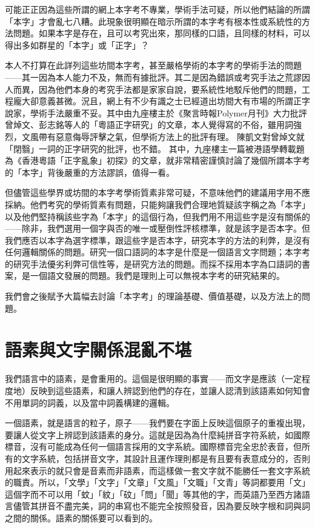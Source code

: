 \documentclass[a5paper, 10pt, openany]{book} %
\begin{document}
可能正正因為這些所謂的網上本字考不專業，學術手法可疑，所以他們結論的所謂「本字」才會亂七八糟。此現象很明顯在暗示所謂的本字考有根本性或系統性的方法問題。如果本字是存在，且可以考究出來，那同樣的口語，且同樣的材料，可以得出多如群星的「本字」或「正字」？

本人不打算在此詳列這些坊間本字考，甚至嚴格學術的本字考的學術手法的問題——其一因為本人能力不及，無而有據批評。其二是因為錯誤或考究手法之荒謬因人而異，因為他們本身的考究手法都是家家自說，要系統性地駁斥他們的問題，工程龐大卻意義甚微。況且，網上有不少有識之士已經道出坊間大有市場的所謂正字說家，學術手法嚴重不妥。其中由九座樓主於《聚言時報Polymer月刊》大力批評曾焯文、彭志銘等人的「粵語正字研究」的文章，本人覺得寫的不俗，雖用詞強烈，文風帶有惡意侮辱評擊之氣，但學術方法上的批評有理。 陳凱文對曾焯文就「閉翳」一詞的正字研究的批評，也不錯。  其中，九座樓主一篇被港語學轉載題為《香港粵語「正字亂象」初探》的文章，就非常精密謹慎討論了幾個所謂本字考的「本字」背後嚴重的方法謬誤，值得一看。 

但儘管這些學界或坊間的本字考學術質素非常可疑，不意味他們的建議用字用不應採納。他們考究的學術質素有問題，只能夠讓我們合理地質疑該字稱之為「本字」以及他們堅持稱該些字為「本字」的這個行為，但我們用不用這些字是沒有關係的——除非，我們選用一個字與否的唯一或壓倒性評核標準，就是該字是否本字。但我們應否以本字為選字標準，跟這些字是否本字，研究本字的方法的利弊，是沒有任何邏輯關係的問題。研究一個口語詞的本字是什麼是一個語言文字問題；本字考的研究手法優劣利弊可信性等，是研究方法的問題。而採不採用本字為口語詞的書案，是一個語文發展的問題。我們是理則上可以無視本字考的研究結果的。

我們會之後賦予大篇幅去討論「本字考」的理論基礎、價值基礎，以及方法上的問題。

\section{語素與文字關係混亂不堪}

我們語言中的語素，是會重用的。這個是很明顯的事實——而文字是應該（一定程度地）反映到這些語素，和讓人辨認到他們的存在，並讓人認清到該語素如何知會不用單詞的詞義，以及當中詞義構建的邏輯。

一個語素，就是語言的粒子，原子——我們要在字面上反映這個原子的重複出現，要讓人從文字上辨認到該語素的身分。這就是因為為什麼純拼音字符系統，如國際標音，沒有可能成為任何一個語言採用的文字系統。國際標音完全忠於表音，但所有的文字系統，包括拼音文字，其設計且運作理則都是有且要有表意成分的，否則用起來表示的就只會是音素而非語素，而這樣做一套文字就不能勝任一套文字系統的職責。所以，「文學」「文字」「文章」「文風」「文職」「文青」等詞都要用「文」這個字而不可以用「蚊」「紋」「砇」「問」「聞」等其他的字，而英語乃至西方諸語言儘管其拼音不盡完美，詞的串寫也不能完全按照發音，因為要反映字根和詞與詞之間的關係。語素的關係要可以看到的。
\end{document}
